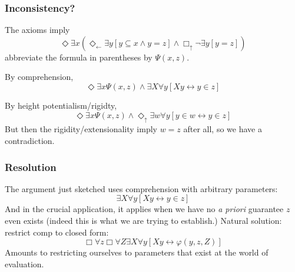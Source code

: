 \documentclass{beamer}
\newcommand{\du}{\Diamond_\uparrow}
\begin{document}
\begin{frame}
    \frametitle{Inconsistency?}
The axioms imply 
\[
    \Diamond \exists x (\Diamond_\leftarrow \exists y[y \subseteq x \wedge y = z] \wedge \Box_\uparrow \neg \exists y[y = z])
\]
abbreviate the formula in parentheses by $\Psi(x, z)$. 

By comprehension,
\[
    \Diamond \exists x \Psi(x, z) \wedge \exists X \forall y[Xy \leftrightarrow y \in z]
\]

By height potentialism/rigidty,
\[
    \Diamond \exists x \Psi(x, z) \wedge \du \exists w \forall y[y \in w \leftrightarrow y \in z]
\]
 But then the rigidity/extensionality imply $w = z$ after all, 
so we have a contradiction.
\end{frame}
\begin{frame}
    \frametitle{Resolution}
The argument just sketched uses comprehension with arbitrary parameters:
\[\exists X\forall y[Xy \leftrightarrow y \in z]\]
 And in the crucial application, it applies when we have no 
\emph{a priori} guarantee $z$ even exists (indeed this is what we are trying 
to establish.)
 Natural solution: restrict comp to closed form:
\[
    \Box \forall z \Box \forall Z \exists X \forall y[Xy \leftrightarrow \varphi(y, z, Z)]
\]
 Amounts to restricting ourselves to parameters that exist at 
the world of evaluation.
\end{frame}
\end{document}
